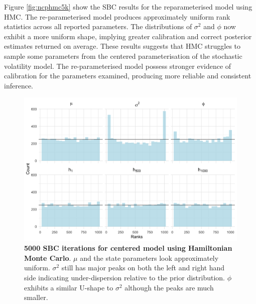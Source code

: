 \documentclass[12pt, a4paper]{article}
\begin{document}
    Figure \ref{fig:ncphmc5k} show the SBC results for the reparameterised model using HMC. The re-parameterised model produces approximately uniform rank statistics across all reported parameters. The distributions of $\sigma^2$ and $\phi$ now exhibit a more uniform shape, implying greater calibration and correct posterior estimates returned on average. These results suggests that HMC struggles to sample some parameters from the centered parameterisation of the stochastic volatility model. The re-parameterised model possess stronger evidence of calibration for the parameters examined, producing more reliable and consistent inference.
        \begin{figure}[H]
        \centering
        \includegraphics[scale=0.09]{results/hmc_cp_5k.png}
        \caption{\textbf{5000 SBC iterations for centered model using Hamiltonian Monte Carlo}. $\mu$ and the state parameters look approximately uniform. $\sigma^2$ still has major peaks on both the left and right hand side indicating under-dispersion relative to the prior distribution. $\phi$ exhibits a similar U-shape to $\sigma^2$ although the peaks are much smaller.}
        \label{fig:cphmc5k}
    \end{figure}
\end{document}
